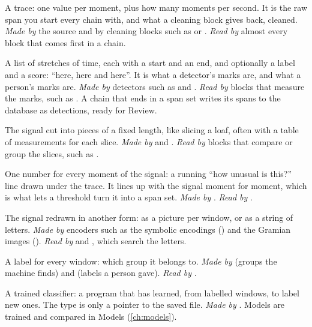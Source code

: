 \begin{description}[style=nextline, leftmargin=1.6em, font=\sffamily\bfseries]
\item[Signal]
  A trace: one value per moment, plus how many moments per second. It is the raw span
  you start every chain with, and what a cleaning block gives back, cleaned. \emph{Made by}
  the source and by cleaning blocks such as  or
  . \emph{Read by} almost every block that comes first in a
  chain.
\item[Span set]
  A list of stretches of time, each with a start and an end, and optionally a label and a
  score: ``here, here and here''. It is what a detector's marks are, and what a
  person's marks are. \emph{Made by} detectors such as  and
  . \emph{Read by} blocks that measure the marks, such as
  . A chain that ends in a span set writes its spans to the
  database as detections, ready for Review.
\item[Window set]
  The signal cut into pieces of a fixed length, like slicing a loaf, often with a table of
  measurements for each slice. \emph{Made by}  and
  . \emph{Read by} blocks that compare or group the
  slices, such as .
\item[Scores]
  One number for every moment of the signal: a running ``how unusual is this?'' line drawn
  under the trace. It lines up with the signal moment for moment, which is what lets a
  threshold turn it into a span set. \emph{Made by} .
  \emph{Read by} .
\item[Encoding]
  The signal redrawn in another form: as a picture per window, or as a string of letters.
  \emph{Made by} encoders such as the symbolic encodings () and
  the Gramian images (). \emph{Read by}
   and , which search
  the letters.
\item[Grouping]
  A label for every window: which group it belongs to. \emph{Made by}
   (groups the machine finds) and
   (labels a person gave). \emph{Read by}
  .
\item[Model]
  A trained classifier: a program that has learned, from labelled windows, to label new
  ones. The type is only a pointer to the saved file. \emph{Made by}
  . Models are trained and compared in Models
  (\cref{ch:models}).
\end{description}

